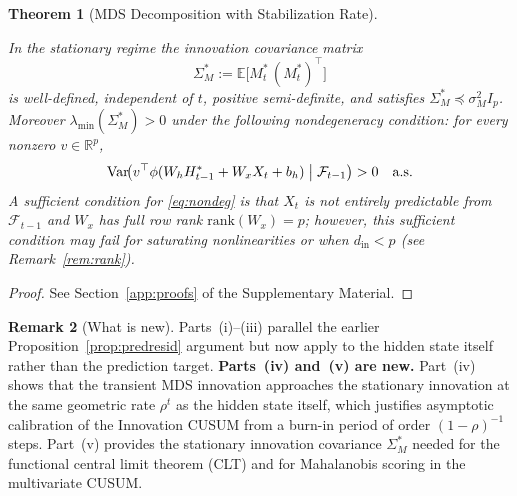 \documentclass[bj,authoryear]{imsart}
\theoremstyle{plain}
\newtheorem{theorem}{Theorem}[section]
\theoremstyle{definition}
\newtheorem{remark}[theorem]{Remark}
\newcommand{\E}{\mathbb{E}}
\newcommand{\R}{\mathbb{R}}
\newcommand{\F}{\mathcal{F}}
\DeclareMathOperator{\Var}{Var}
\begin{document}
\begin{theorem}[MDS Decomposition with Stabilization Rate]
\begin{enumerate}[label=(\roman*), itemsep=3pt]
      In the stationary regime the innovation covariance matrix
      \begin{equation}
        \Sigma_M^* := \E\bigl[M_t^*\,(M_t^*)^\top\bigr]
        \label{eq:SigmaM}
      \end{equation}
      is well-defined, independent of $t$, positive semi-definite,
      and satisfies $\Sigma_M^* \preceq \sigma_M^2 I_p$.
      Moreover $\lambda_{\min}(\Sigma_M^*)>0$ under the following
      nondegeneracy condition: for every nonzero $v\in\R^p$,
      \begin{equation}
        \Var\!\bigl(v^\top\phi(W_hH_{t-1}^*+W_xX_t+b_h)
          \bigm|\F_{t-1}\bigr) > 0
        \quad \text{a.s.}
        \label{eq:nondeg}
      \end{equation}
      A sufficient condition for \eqref{eq:nondeg} is that $X_t$ is not
      entirely predictable from $\F_{t-1}$ and $W_x$ has full row rank
      $\mathrm{rank}(W_x)=p$; however, this sufficient condition may fail
      for saturating nonlinearities or when $d_{\mathrm{in}}<p$
      (see Remark~\ref{rem:rank}).
  \end{enumerate}
\end{theorem}

\begin{proof}
  See Section~\ref{app:proofs} of the Supplementary Material.
\end{proof}

\begin{remark}[What is new]
  Parts~(i)--(iii) parallel the earlier Proposition~\ref{prop:predresid}
  argument but now apply to the hidden state itself rather than the
  prediction target.  \textbf{Parts~(iv) and~(v) are new.}
  Part~(iv) shows that the transient MDS innovation approaches the
  stationary innovation at the same geometric rate $\rho^t$ as the
  hidden state itself, which justifies asymptotic calibration of
  the Innovation CUSUM from a burn-in period of order $(1-\rho)^{-1}$ steps.
  Part~(v) provides the stationary innovation covariance $\Sigma_M^*$
  needed for the functional central limit theorem (CLT) and for Mahalanobis
  scoring in the multivariate CUSUM.
\end{remark}
\end{document}
